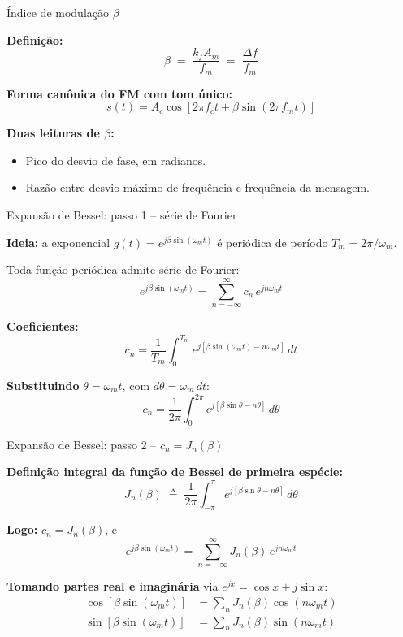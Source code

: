 
\begin{frame}{Índice de modulação $\beta$}

\textbf{Definição:}
\[
\boxed{\;\beta \;=\; \frac{k_f A_m}{f_m} \;=\; \frac{\Delta f}{f_m}\;}
\]

\pause
\textbf{Forma canônica do FM com tom único:}
\[
\boxed{\;s(t) = A_c \cos[2\pi f_c t + \beta \sin(2\pi f_m t)]\;}
\]

\vspace{0.3cm}
\pause
\textbf{Duas leituras de $\beta$:}
\begin{itemize}
\item Pico do desvio de fase, em radianos.
\item Razão entre desvio máximo de frequência e frequência da mensagem.
\end{itemize}

\end{frame}


\begin{frame}{Expansão de Bessel: passo 1 -- série de Fourier}

\textbf{Ideia:} a exponencial $g(t) = e^{j\beta\sin(\omega_m t)}$ é periódica de período $T_m = 2\pi/\omega_m$.

\pause
Toda função periódica admite série de Fourier:
\[
e^{j\beta\sin(\omega_m t)} = \sum_{n=-\infty}^{\infty} c_n\, e^{jn\omega_m t}
\]

\pause
\textbf{Coeficientes:}
\[
c_n = \frac{1}{T_m}\int_{0}^{T_m}\! e^{j[\beta\sin(\omega_m t) - n\omega_m t]}\,dt
\]

\pause
\textbf{Substituindo} $\theta = \omega_m t$, com $d\theta = \omega_m\,dt$:
\[
c_n = \frac{1}{2\pi}\int_{0}^{2\pi}\! e^{j[\beta\sin\theta - n\theta]}\,d\theta
\]

\end{frame}


\begin{frame}{Expansão de Bessel: passo 2 -- $c_n = J_n(\beta)$}

\textbf{Definição integral da função de Bessel de primeira espécie:}
\[
\boxed{\,J_n(\beta) \;\triangleq\; \frac{1}{2\pi}\int_{-\pi}^{\pi}\! e^{j[\beta\sin\theta - n\theta]}\,d\theta\,}
\]

\pause
\textbf{Logo:} $c_n = J_n(\beta)$, e
\[
e^{j\beta\sin(\omega_m t)} = \sum_{n=-\infty}^{\infty} J_n(\beta)\, e^{jn\omega_m t}
\]

\pause
\textbf{Tomando partes real e imaginária} via $e^{jx} = \cos x + j\sin x$:
\begin{align*}
\cos[\beta\sin(\omega_m t)] &= \sum_{n} J_n(\beta)\cos(n\omega_m t)\\
\sin[\beta\sin(\omega_m t)] &= \sum_{n} J_n(\beta)\sin(n\omega_m t)
\end{align*}

\end{frame}

